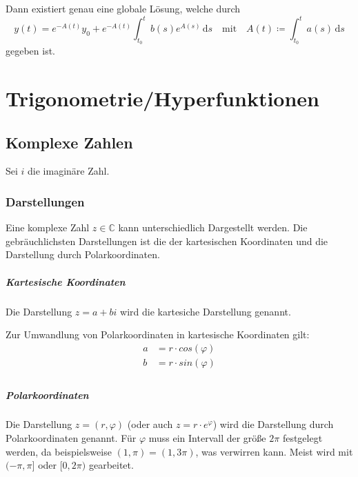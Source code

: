             Dann existiert genau eine globale Lösung, welche durch
            \begin{equation*}
                y(t) = e ^ { -A(t) } y _ 0 + e ^ { -A(t) } \int _ { t _ 0 } ^ t \! b(s) e ^ { A(s) } \, \mathrm{d}s \quad\text{mit}\quad A(t) \coloneqq \int _ { t _ 0 } ^ t \! a(s) \, \mathrm{d}s
            \end{equation*}
            gegeben ist.

        \paragraph{}

\chapter{Trigonometrie/Hyperfunktionen}
    \section{Komplexe Zahlen}
        Sei $ i $ die imaginäre Zahl.

        \subsection{Darstellungen}
            Eine komplexe Zahl $ z \in \mathbb{C} $ kann unterschiedlich Dargestellt werden. Die gebräuchlichsten Darstellungen ist die der kartesischen Koordinaten und die Darstellung durch Polarkoordinaten.

            \paragraph{Kartesische Koordinaten}
                Die Darstellung $ z = a + bi $ wird die kartesiche Darstellung genannt.

                Zur Umwandlung von Polarkoordinaten in kartesische Koordinaten gilt:
                \begin{align*}
                    a &= r \cdot cos(\varphi) \\
                    b &= r \cdot sin(\varphi) \\
                \end{align*}

            \paragraph{Polarkoordinaten}
                Die Darstellung $ z = (r, \varphi) $ (oder auch $ z = r \cdot e ^ \varphi $) wird die Darstellung durch Polarkoordinaten genannt. Für $ \varphi $ muss ein Intervall der größe $ 2\pi $ festgelegt werden, da beispielsweise $ (1, \pi) = (1, 3\pi) $, was verwirren kann. Meist wird mit $ (-\pi, \pi] $ oder $ [0, 2\pi) $ gearbeitet.

